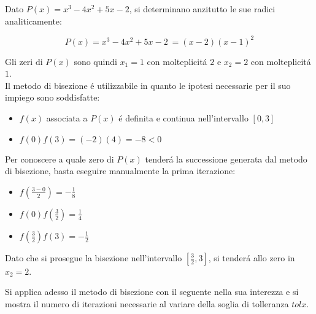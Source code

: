 \begin{center}
\footnotesize\noindent{}\end{center}

\noindent Dato \(P(x) = x^3 - 4x^2 + 5x - 2\), si determinano anzitutto le sue radici analiticamente:

\[
P(x) = x^3 - 4x^2 + 5x - 2\ = (x-2)(x-1)^2
\]

\noindent Gli zeri di \(P(x)\) sono quindi \(x_1=1\) con molteplicit\'a \(2\) e \(x_2=2\) con molteplicit\'a \(1\).\\

\noindent Il metodo di bisezione \'e utilizzabile in quanto le ipotesi necessarie per il suo impiego sono soddisfatte:

\begin{itemize}

\item \(f(x)\) associata a \(P(x)\) \'e definita e continua nell'intervallo \([0,3]\)
\item \(f(0)f(3) = (-2)(4) = -8 < 0\)

\end{itemize}

\noindent Per conoscere a quale zero di \(P(x)\) tender\'a la successione generata dal metodo di bisezione, basta eseguire manualmente la prima iterazione:

\begin{itemize}
\item \(f(\frac{3-0}{2}) = -\frac{1}{8}\)
\item \(f(0)f(\frac{3}{2}) = \frac{1}{4}\)
\item \(f(\frac{3}{2})f(3) = -\frac{1}{2}\)
\end{itemize}

\noindent Dato che si prosegue la bisezione nell'intervallo \([\frac{3}{2}, 3]\), si tender\'a allo zero in \(x_2=2\).

\noindent Si applica adesso il metodo di bisezione con il seguente nella sua interezza e si mostra il numero di iterazioni necessarie al variare della soglia di tolleranza \(tolx\).\\

